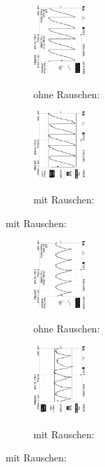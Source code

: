 \begin{figure}
\caption{$U_{out} (\phi = 90°$) }
\begin{subfigure}{0.48\textwidth}
\centering
\caption{ohne Rauschen:}
\includegraphics[angle=90,height=2.6cm]{graphics/ALL0033/F0033TEK.jpg}
\label{fig:phi90o}
\end{subfigure}
\begin{subfigure}{0.48\textwidth}
\centering
\caption{mit Rauschen:}
\includegraphics[angle=90,height=2.6cm]{graphics/ALL0041/F0041TEK.jpg}
\label{fig:phi90m}
\end{subfigure}
\end{figure}

\begin{figure}
\caption{$U_{out} (\phi = 180°$) }
\begin{subfigure}{0.48\textwidth}
\centering
\caption{ohne Rauschen:}
\includegraphics[angle=90,height=2.6cm]{graphics/ALL0034/F0034TEK.jpg}
\label{fig:phi180o}
\end{subfigure}
\begin{subfigure}{0.48\textwidth}
\centering
\caption{mit Rauschen:}
\includegraphics[angle=90,height=2.6cm]{graphics/ALL0042/F0042TEK.jpg}
\label{fig:phi180m}
\end{subfigure}
\end{figure}

